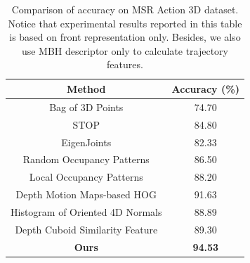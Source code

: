 \documentclass[review]{elsarticle}
\begin{document}
\begin{table}
	\begin{center}
		\begin{tabular}{c|c}
		
		  {\bf Method} & {\bf Accuracy (\%)} \\
		\hline
		Bag of 3D Points \cite{li2010action} &         74.70  \\
		
		      STOP \cite{vieira2012stop} &         84.80  \\
		
		EigenJoints \cite{yang2012eigenjoints} &         82.33  \\
		
		Random Occupancy Patterns \cite{wang2012robust} &         86.50  \\
		
		Local Occupancy Patterns \cite{wang2012mining} &         88.20  \\
		
		Depth Motion Maps-based HOG \cite{yang2012recognizing} &         91.63  \\
		
		Histogram of Oriented 4D Normals \cite{oreifej2013hon4d} &         88.89  \\
		
		Depth Cuboid Similarity Feature \cite{xia2013spatio} &         89.30  \\
		\hline
		    {\bf Ours} &   {\bf 94.53 } \\
		
		\end{tabular}  
	\end{center}
	\caption{\label{lbl:Table_MBHvsSoAonFront}Comparison of accuracy on MSR Action 3D dataset. Notice that experimental results reported in this table is based on front representation only. Besides, we also use MBH descriptor only to calculate trajectory features.}
\end{table}
\end{document}
